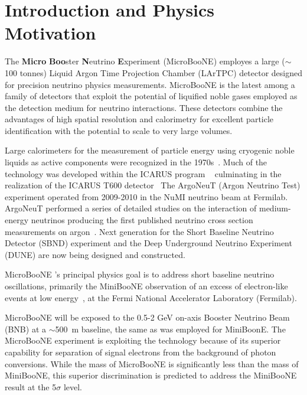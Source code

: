 \section{Introduction and Physics Motivation}

The {\bf{Micro}} {\bf{Boo}}ster {\bf{N}}eutrino {\bf{E}}xperiment (MicroBooNE) employes a large ($\sim$100 tonnes) Liquid Argon Time Projection Chamber (LArTPC) detector designed for precision neutrino physics measurements.   MicroBooNE is the latest among a family of detectors that exploit the potential of liquified noble gases employed as the detection medium for neutrino interactions.   These detectors combine the advantages of high spatial resolution and calorimetry for excellent particle identification with the potential to scale to very large volumes. 

Large calorimeters for the measurement of particle energy using cryogenic noble liquids as active components were recognized in the 1970s~\cite{Willis:1974}.  Much of the \lartpc technology was developed within the ICARUS program ~\cite{Benetti:1993-3ton,Cennini:1994-3ton,Arneodo:1999-50l} culminating in the realization of the ICARUS T600 detector~\cite{Amerio:2004-T600}   The ArgoNeuT (Argon Neutrino Test) experiment operated from 2009-2010 in the NuMI neutrino beam at Fermilab.   ArgoNeuT performed a series of detailed studies on the interaction of medium-energy neutrinos \cite{Acciarri:2013-argoneut-recomb}  producing the first published neutrino cross section measurements on argon~\cite{Anderson:2012-argoneut-CCincl,Acciarri:2014-argoneut-CCxsec,Acciarri:2014eit}.   Next generation \lartpcs for the Short Baseline Neutrino Detector (SBND) experiment and the Deep Underground Neutrino Experiment (DUNE) are now being designed and constructed.   
   
MicroBooNE 's principal physics goal is to address short baseline neutrino oscillations, primarily the MiniBooNE observation of an excess of electron-like events at low energy~\cite{AguilarArevalo:2008rc}, at the Fermi National Accelerator Laboratory (Fermilab).  


MicroBooNE will be exposed to the  0.5-2 GeV on-axis Booster Neutrino Beam (BNB) at a $\sim$500~m baseline, the same as was employed for MiniBoonE.  The MicroBooNE experiment is exploiting the \lartpc technology because of its superior capability for separation of signal electrons from the background of photon conversions.   While the mass of MicroBooNE is significantly less than the mass of MiniBooNE, this superior discrimination is predicted to address the MiniBooNE result at the 5$\sigma$ level.   

